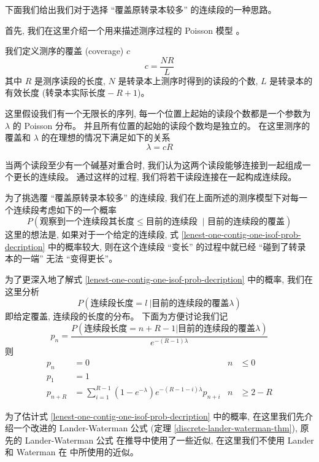 下面我们给出我们对于选择 ``覆盖原转录本较多'' 的连续段的一种思路。

首先, 我们在这里介绍一个用来描述测序过程的 Poisson 模型 \cite{waterman1994sequence}。

我们定义测序的覆盖 (coverage) $c$
\begin{equation}
c = \frac{NR}{L}
\end{equation}
其中 $R$ 是测序读段的长度, $N$ 是转录本上测序时得到的读段的个数, 
$L$ 是转录本的有效长度 ($\text{转录本实际长度} -R+1$)。 

这里假设我们有一个无限长的序列, 
每一个位置上起始的读段个数都是一个参数为 $\lambda$ 的 Poisson 分布。 
并且所有位置的起始的读段个数均是独立的。 
在这里测序的覆盖和 $\lambda$ 的在理想的情况下满足如下的关系
\[
\lambda = c R
\]

当两个读段至少有一个碱基对重合时, 
我们认为这两个读段能够连接到一起组成一个更长的连续段。 通过这样的过程, 
我们将若干读段连接在一起构成连续段。 

为了挑选覆 ``覆盖原转录本较多'' 的连续段, 
我们在上面所述的测序模型下对每一个连续段考虑如下的一个概率
\begin{equation}
\label{lenest-one-contig-one-isof-prob-decription}
P(\text{观察到一个连续段其长度} \leq \text{目前的连续段 }\ |\text{ 目前的连续段的覆盖})
\end{equation}
这里的想法是, 如果对于一个给定的连续段, 
式 \eqref{lenest-one-contig-one-isof-prob-decription} 
中的概率较大, 则在这个连续段 ``变长'' 的过程中就已经 ``碰到了转录本的一端'' 无法 
``变得更长''。 

为了更深入地了解式 \eqref{lenest-one-contig-one-isof-prob-decription} 中的概率, 
我们在这里分析
\begin{equation}
\label{lenest-one-cont-prob-distr}
P(\text{连续段长度} = l\ | \text{目前的连续段的覆盖} \lambda)
\end{equation}
即给定覆盖, 连续段的长度的分布。 
下面为方便讨论我们记
\begin{equation}
p_n =  \frac{P(\text{连续段长度} = n+R-1 | \text{目前的连续段的覆盖} \lambda)}{e^{-(R-1)\lambda}}
\end{equation}
则
\begin{align}
p_n &= 0 & n &\leq 0 \\
p_1 &= 1 & & \\
p_{n+R} &= \sum_{i=1}^{R-1} (1-e^{-\lambda}) e^{-(R-1-i)\lambda} p_{n+i} & n &\geq 2-R
\end{align}

为了估计式 \eqref{lenest-one-contig-one-isof-prob-decription} 中的概率, 
在这里我们先介绍一个改进的 Lander-Waterman 公式 (定理 \ref{discrete-lander-waterman-thm}), 
原先的 Lander-Waterman 公式 \cite{lander1988genomic} 在推导中使用了一些近似, 
在这里我们不使用 Lander 和 Waterman 在  中所使用的近似。 

